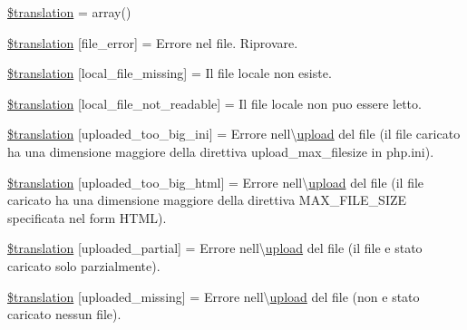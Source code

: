 \begin{DoxyCompactItemize}
\item 
\hyperlink{class_8upload_8it___i_t_8php_a1f198d410fecc3871ebdd468d343a5e3}{\$translation} = array()
\item 
\hyperlink{class_8upload_8it___i_t_8php_ac7498e49b9771b04698029aa61c70821}{\$translation} \mbox{[}\textquotesingle{}file\+\_\+error\textquotesingle{}\mbox{]} = \textquotesingle{}Errore nel file. Riprovare.\textquotesingle{}
\item 
\hyperlink{class_8upload_8it___i_t_8php_a6ec3d3a47ab70d77e7aa593e82ead10e}{\$translation} \mbox{[}\textquotesingle{}local\+\_\+file\+\_\+missing\textquotesingle{}\mbox{]} = \textquotesingle{}Il file locale non esiste.\textquotesingle{}
\item 
\hyperlink{class_8upload_8it___i_t_8php_a60104befef9b241f3a7a6a755618a4b3}{\$translation} \mbox{[}\textquotesingle{}local\+\_\+file\+\_\+not\+\_\+readable\textquotesingle{}\mbox{]} = \textquotesingle{}Il file locale non puo essere letto.\textquotesingle{}
\item 
\hyperlink{class_8upload_8it___i_t_8php_a6a08dcd0d3651fdd098568f6b2f0a42c}{\$translation} \mbox{[}\textquotesingle{}uploaded\+\_\+too\+\_\+big\+\_\+ini\textquotesingle{}\mbox{]} = \textquotesingle{}Errore nell\textbackslash{}\textquotesingle{}\hyperlink{classupload}{upload} del file (il file caricato ha una dimensione maggiore della direttiva upload\+\_\+max\+\_\+filesize in php.\+ini).\textquotesingle{}
\item 
\hyperlink{class_8upload_8it___i_t_8php_a623d5b8b92169f57d7e43458aa911cbb}{\$translation} \mbox{[}\textquotesingle{}uploaded\+\_\+too\+\_\+big\+\_\+html\textquotesingle{}\mbox{]} = \textquotesingle{}Errore nell\textbackslash{}\textquotesingle{}\hyperlink{classupload}{upload} del file (il file caricato ha una dimensione maggiore della direttiva M\+A\+X\+\_\+\+F\+I\+L\+E\+\_\+\+S\+I\+Z\+E specificata nel form H\+T\+M\+L).\textquotesingle{}
\item 
\hyperlink{class_8upload_8it___i_t_8php_a967c17da21b0a2d3bd65cca3a9ca0ea8}{\$translation} \mbox{[}\textquotesingle{}uploaded\+\_\+partial\textquotesingle{}\mbox{]} = \textquotesingle{}Errore nell\textbackslash{}\textquotesingle{}\hyperlink{classupload}{upload} del file (il file e stato caricato solo parzialmente).\textquotesingle{}
\item 
\hyperlink{class_8upload_8it___i_t_8php_a0cce433260be65f1f35853a6b4b8952b}{\$translation} \mbox{[}\textquotesingle{}uploaded\+\_\+missing\textquotesingle{}\mbox{]} = \textquotesingle{}Errore nell\textbackslash{}\textquotesingle{}\hyperlink{classupload}{upload} del file (non e stato caricato nessun file).\textquotesingle{}

\end{DoxyCompactItemize}
